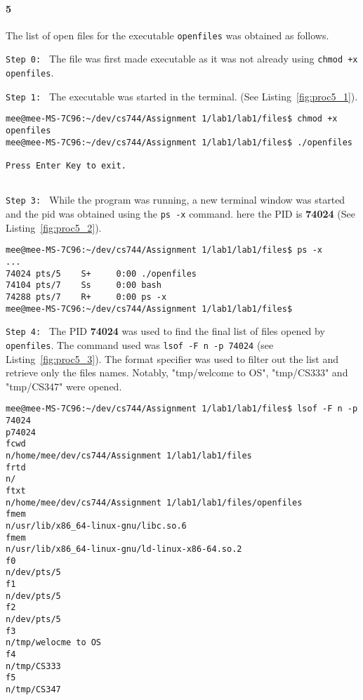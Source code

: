 \documentclass[final,5p,times,authoryear]{elsarticle}
\begin{document}
\pagebreak

\paragraph{\bf 5}
The list of open files for the executable {\tt openfiles} was obtained as follows.

{\tt Step 0: } The file was first made executable as it was not already using {\tt chmod +x openfiles}.

{\tt Step 1: } The executable was started in the terminal. (See Listing~\ref{fig:proc5_1}).

\begin{lstlisting}[captionpos=b, caption={Snippet showing the command used to execute {\tt openfiles}},label={fig:proc5_1},style=codeBash]
mee@mee-MS-7C96:~/dev/cs744/Assignment 1/lab1/lab1/files$ chmod +x openfiles 
mee@mee-MS-7C96:~/dev/cs744/Assignment 1/lab1/lab1/files$ ./openfiles 

Press Enter Key to exit.
  
\end{lstlisting}

{\tt Step 3: } While the program was running, a new terminal window was started and the pid was obtained using the {\tt ps -x} command. here the PID is {\bf 74024} (See Listing~\ref{fig:proc5_2}).

\begin{lstlisting}[captionpos=b, caption={Snippet showing the running processes listed by {\tt ps}.},label={fig:proc5_2},style=codeBash]
  mee@mee-MS-7C96:~/dev/cs744/Assignment 1/lab1/lab1/files$ ps -x
...
74024 pts/5    S+     0:00 ./openfiles
74104 pts/7    Ss     0:00 bash
74288 pts/7    R+     0:00 ps -x
mee@mee-MS-7C96:~/dev/cs744/Assignment 1/lab1/lab1/files$ 
\end{lstlisting}

{\tt Step 4: } The PID {\bf 74024} was used to find the final list of files opened by {\tt openfiles}. The command used was {\tt lsof -F n -p 74024} (see Listing~\ref{fig:proc5_3}). The format specifier was used to filter out the list and retrieve only the files names. Notably, "tmp/welcome to OS", "tmp/CS333" and "tmp/CS347" were opened.

\begin{lstlisting}[captionpos=b, caption={Snippet showing list of open files for {\tt openfiles}.},label={fig:proc5_3},style=codeBash]
mee@mee-MS-7C96:~/dev/cs744/Assignment 1/lab1/lab1/files$ lsof -F n -p 74024
p74024
fcwd
n/home/mee/dev/cs744/Assignment 1/lab1/lab1/files
frtd
n/
ftxt
n/home/mee/dev/cs744/Assignment 1/lab1/lab1/files/openfiles
fmem
n/usr/lib/x86_64-linux-gnu/libc.so.6
fmem
n/usr/lib/x86_64-linux-gnu/ld-linux-x86-64.so.2
f0
n/dev/pts/5
f1
n/dev/pts/5
f2
n/dev/pts/5
f3
n/tmp/welocme to OS
f4
n/tmp/CS333
f5
n/tmp/CS347

\end{lstlisting}
\end{document}
